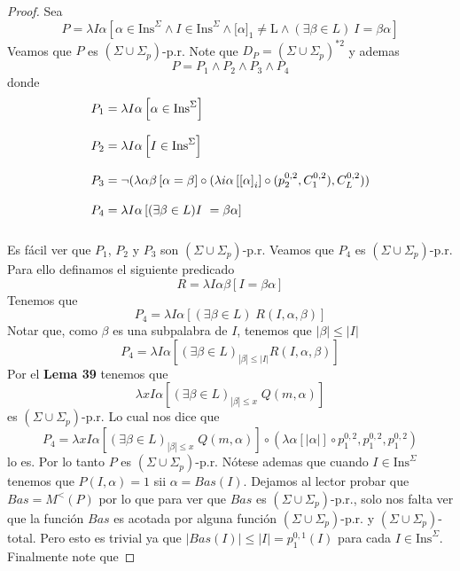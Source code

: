 \begin{lemma}
\begin{proof}
    \noindent Sea
    \[
      \displaystyle P=\lambda I\alpha \left[ \alpha \in \mathrm{Ins}^{\Sigma }\wedge I\in \mathrm{Ins}^{\Sigma }\wedge
      \lbrack \alpha ]_{1}\neq \mathrm{L}\wedge (\exists \beta \in L)\ I=\beta \alpha \right]
    \]
    Veamos que $P$ es $(\Sigma \cup \Sigma _{p})$-p.r.
    Note que $D_{P}=(\Sigma \cup \Sigma _{p})^{\ast 2}$ y ademas
    \[
      \displaystyle P = P_1 \land P_2 \land P_3 \land P_4
    \]
    donde
    \[
      \begin{array}{lll}
        \displaystyle
        \bigskip
        P_1 = \lambda I\alpha \left[ \alpha \in \mathrm{Ins}^{\Sigma} \right] \\
        \bigskip
        P_2 = \lambda I\alpha \left[ I \in \mathrm{Ins}^{\Sigma } \right] \\
        \bigskip
        P_3 = \neg  (\lambda \alpha\beta \left[ \alpha =\beta \right] \circ
                    (
                      \lambda i\alpha \left[ \left[\alpha\right]_i \right] \circ
                      (
                      p_{2}^{0,2},
                      C_{1}^{0,2}
                      ), C_{L}^{0,2}
                    )) \\
        \bigskip
        P_4 = \lambda I\alpha \left[ (\exists \beta \in L)  I\ = \beta\alpha \right]
      \end{array}
    \]
    Es fácil ver que $P_1$, $P_2$ y $P_3$ son $(\Sigma \cup \Sigma _{p})$-p.r.
    Veamos que $P_4$ es $(\Sigma \cup \Sigma _{p})$-p.r. Para ello definamos el siguiente predicado
    \[
      R = \lambda I\alpha\beta \left[ I = \beta\alpha\right]
    \]
    Tenemos que
    \[
      P_4 = \lambda I\alpha \left[ (\exists \beta \in L)\; R(I, \alpha, \beta) \right]
    \]
    Notar que, como $\beta$ es una subpalabra de $I$, tenemos que $|\beta| \leq |I|$
    \[
      P_4 = \lambda I\alpha \left[ (\exists \beta \in L)_{|\beta|\leq |I|} R(I, \alpha, \beta) \right]
    \]
    Por el \textbf{Lema 39} tenemos que
    \[
      \displaystyle \lambda xI\alpha \left[ (\exists \beta \in L)_{|\beta|\leq x}\;Q(m,\alpha ) \right]
    \]
    es $(\Sigma \cup \Sigma _{p})$-p.r. Lo cual nos dice que
    \[
      \displaystyle P_4 = \lambda xI\alpha \left[ (\exists \beta \in L)_{|\beta|\leq x}\;Q(m,\alpha ) \right] \circ
      (\lambda \alpha \left[ |\alpha| \right] \circ p_{1}^{0,2}, p_{1}^{0,2}, p_{1}^{0,2})
    \]
    lo es.
    Por lo tanto $P$ es $(\Sigma \cup \Sigma _{p})$-p.r.
    Nótese ademas que cuando $I\in \mathrm{Ins}^{\Sigma }$ tenemos que
    $P(I,\alpha )=1$ sii $\alpha =Bas(I)$.
    Dejamos al lector probar que $Bas=M^{< }\left( P\right) $ %
    por lo que para ver que $Bas$ es $(\Sigma \cup \Sigma _{p})$-p.r., solo nos falta ver que la función $Bas$
    es acotada por alguna función $(\Sigma \cup \Sigma _{p})$-p.r. y $(\Sigma \cup \Sigma _{p})$-total.
    Pero esto es trivial ya que $\left\vert Bas(I)\right\vert \leq \left\vert I\right\vert =p_{1}^{0,1}(I)$
    para cada $I\in \mathrm{Ins}^{\Sigma }$.
    Finalmente note que


\end{proof}
\end{lemma}
